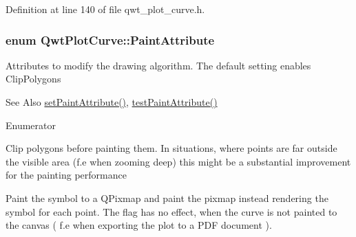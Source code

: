 Definition at line 140 of file qwt\-\_\-plot\-\_\-curve.\-h.

\hypertarget{class_qwt_plot_curve_a96db1b854c63bfbc452c943251a11b66}{
\subsubsection[{Paint\-Attribute}]{\setlength{\rightskip}{0pt plus 5cm}enum {\bf Qwt\-Plot\-Curve\-::\-Paint\-Attribute}}}\label{class_qwt_plot_curve_a96db1b854c63bfbc452c943251a11b66}
Attributes to modify the drawing algorithm. The default setting enables Clip\-Polygons

\begin{DoxySeeAlso}{See Also}
\hyperlink{class_qwt_plot_curve_a7f9c70366415b5cb068af80be5bf3748}{set\-Paint\-Attribute()}, \hyperlink{class_qwt_plot_curve_ad262cf6b8448d3cb693cbceecc6d8481}{test\-Paint\-Attribute()} 
\end{DoxySeeAlso}
\begin{Desc}
\item[Enumerator]\par
\begin{description}
\item[{\em 
\hypertarget{class_qwt_plot_curve_a96db1b854c63bfbc452c943251a11b66a26f9aa8ae434aa94b4049b9908995abf}{Clip\-Polygons}\label{class_qwt_plot_curve_a96db1b854c63bfbc452c943251a11b66a26f9aa8ae434aa94b4049b9908995abf}
}]Clip polygons before painting them. In situations, where points are far outside the visible area (f.\-e when zooming deep) this might be a substantial improvement for the painting performance \item[{\em 
\hypertarget{class_qwt_plot_curve_a96db1b854c63bfbc452c943251a11b66abc3af223152fb6195b31861eb3bcaf78}{Cache\-Symbols}\label{class_qwt_plot_curve_a96db1b854c63bfbc452c943251a11b66abc3af223152fb6195b31861eb3bcaf78}
}]Paint the symbol to a Q\-Pixmap and paint the pixmap instead rendering the symbol for each point. The flag has no effect, when the curve is not painted to the canvas ( f.\-e when exporting the plot to a P\-D\-F document ). \end{description}
\end{Desc}


